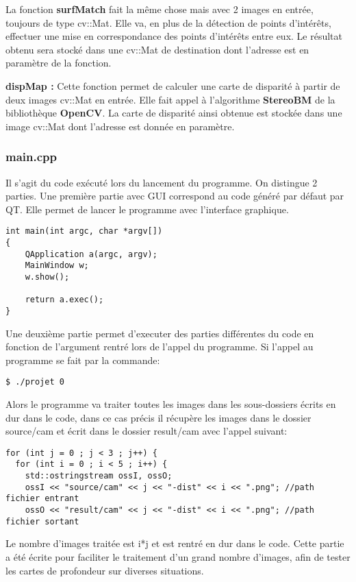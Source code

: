 \documentclass[a4paper]{article}
\begin{document}
La fonction \textbf{surfMatch} fait la même chose mais avec 2 images en entrée,
toujours de type cv::Mat. Elle va, en plus de la détection de points d'intérêts,
effectuer une mise en correspondance des points d'intérêts entre eux. Le résultat
obtenu sera stocké dans une cv::Mat de destination dont l'adresse est en paramètre
de la fonction.


\textbf{dispMap :} Cette fonction permet de calculer une carte de disparité à
partir de deux images cv::Mat en entrée. Elle fait appel à l'algorithme
\textbf{StereoBM} de la bibliothèque \textbf{OpenCV}. La carte de disparité ainsi
obtenue est stockée dans une image cv::Mat dont l'adresse est donnée en paramètre.

\subsubsection*{main.cpp}

Il s'agit du code exécuté lors du lancement du programme. On distingue 2 parties.
Une première partie avec GUI correspond au code généré par défaut par QT.
Elle permet de lancer le programme avec l'interface graphique.

\begin{verbatim}
int main(int argc, char *argv[])
{
	QApplication a(argc, argv);
	MainWindow w;
	w.show();

	return a.exec();
}
\end{verbatim}

Une deuxième partie permet d'executer des parties différentes du code en fonction de l'argument rentré lors de l'appel du programme. Si l'appel au programme se fait par la commande:
\begin{verbatim}
$ ./projet 0
\end{verbatim}
Alors le programme va traiter toutes les images dans les sous-dossiers écrits en dur dans le code, dans ce cas précis il récupère les images dans le dossier source/cam et écrit dans le dossier result/cam avec l'appel suivant:
\begin{verbatim}
for (int j = 0 ; j < 3 ; j++) {
  for (int i = 0 ; i < 5 ; i++) {
    std::ostringstream ossI, ossO;
    ossI << "source/cam" << j << "-dist" << i << ".png"; //path fichier entrant
    ossO << "result/cam" << j << "-dist" << i << ".png"; //path fichier sortant
\end{verbatim}
Le nombre d'images traitée est i*j et est rentré en dur dans le code. Cette partie a été écrite pour faciliter le traitement d'un grand nombre d'images, afin de tester les cartes de profondeur sur diverses situations.
\end{document}
